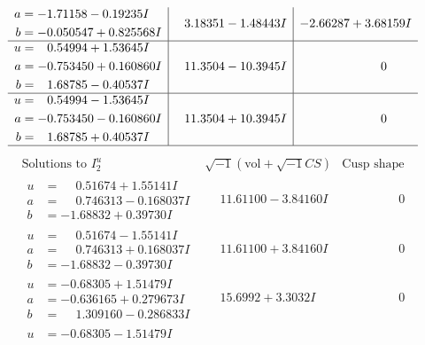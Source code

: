 \documentclass[1p]{elsarticle_modified}
\theoremstyle{definition}
\newcommand{\I}{\sqrt{-1}}
\begin{document}
$$\begin{array}{c|c|c}
\begin{aligned}
a &= -1.71158 - 0.19235 I \\
b &= -0.050547 + 0.825568 I\end{aligned}
 & \phantom{-}3.18351 - 1.48443 I & -2.66287 + 3.68159 I \\ \hline\begin{aligned}
u &= \phantom{-}0.54994 + 1.53645 I \\
a &= -0.753450 + 0.160860 I \\
b &= \phantom{-}1.68785 - 0.40537 I\end{aligned}
 & \phantom{-}11.3504 - 10.3945 I & \phantom{-0.000000 } 0 \\ \hline\begin{aligned}
u &= \phantom{-}0.54994 - 1.53645 I \\
a &= -0.753450 - 0.160860 I \\
b &= \phantom{-}1.68785 + 0.40537 I\end{aligned}
 & \phantom{-}11.3504 + 10.3945 I & \phantom{-0.000000 } 0\\
 \hline 
 \end{array}$$\newpage$$\begin{array}{c|c|c}  
\text{Solutions to }I^u_{2}& \I (\text{vol} + \sqrt{-1}CS) & \text{Cusp shape}\\
 \hline 
\begin{aligned}
u &= \phantom{-}0.51674 + 1.55141 I \\
a &= \phantom{-}0.746313 - 0.168037 I \\
b &= -1.68832 + 0.39730 I\end{aligned}
 & \phantom{-}11.61100 - 3.84160 I & \phantom{-0.000000 } 0 \\ \hline\begin{aligned}
u &= \phantom{-}0.51674 - 1.55141 I \\
a &= \phantom{-}0.746313 + 0.168037 I \\
b &= -1.68832 - 0.39730 I\end{aligned}
 & \phantom{-}11.61100 + 3.84160 I & \phantom{-0.000000 } 0 \\ \hline\begin{aligned}
u &= -0.68305 + 1.51479 I \\
a &= -0.636165 + 0.279673 I \\
b &= \phantom{-}1.309160 - 0.286833 I\end{aligned}
 & \phantom{-}15.6992 + 3.3032 I & \phantom{-0.000000 } 0 \\ \hline\begin{aligned}
u &= -0.68305 - 1.51479 I \\

\end{aligned}
\end{array}$$
\end{document}
